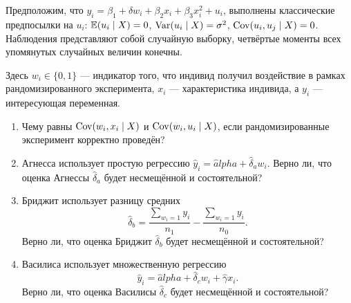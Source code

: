 \begin{problem}
  Предположим, что $y_i = \beta_1 + \delta w_i + \beta_2 x_i + \beta_3 x_i^2 + u_i$,
  выполнены классические предпосылки на $u_i$: $\operatorname{\mathbb E}(u_i \mid X) = 0$,
  $\operatorname{Var}(u_i \mid X) = \sigma^2$, $\operatorname{Cov}(u_i, u_j \mid X) = 0$.
  Наблюдения представляют собой случайную выборку, четвёртые моменты 
  всех упомянутых случайных величин конечны. 

  Здесь $w_i \in \{0, 1\}$ — индикатор того, что индивид получил воздействие 
  в рамках рандомизированного эксперимента, $x_i$ — характеристика индивида,
 а $y_i$ — интересующая переменная. 

 \begin{enumerate}
  \item Чему равны $\operatorname{Cov}(w_i, x_i \mid X)$ и $\operatorname{Cov}(w_i, u_i \mid X)$,
  если рандомизированные эксперимент корректно проведён?
   \item Агнесса использует простую регрессию $\hat y_i = \hat alpha + \hat \delta_a w_i$.
   Верно ли, что оценка Агнессы $\hat \delta_a$ будет несмещённой и состоятельной?
   \item Бриджит использует разницу средних 
   \[
     \hat \delta_b = \frac{\sum_{w_i = 1}y_i}{n_1} - \frac{\sum_{w_i = 1}y_i}{n_0}.
  \]
  Верно ли, что оценка Бриджит $\hat \delta_b$ будет несмещённой и состоятельной?
\item Василиса использует множественную регрессию 
\[
  \hat y_i = \hat alpha + \hat \delta_c w_i + \hat \gamma x_i.
\]
Верно ли, что оценка Василисы $\hat \delta_c$ будет несмещённой и состоятельной?
\end{enumerate}


\begin{sol}

\end{sol}




\end{problem}

